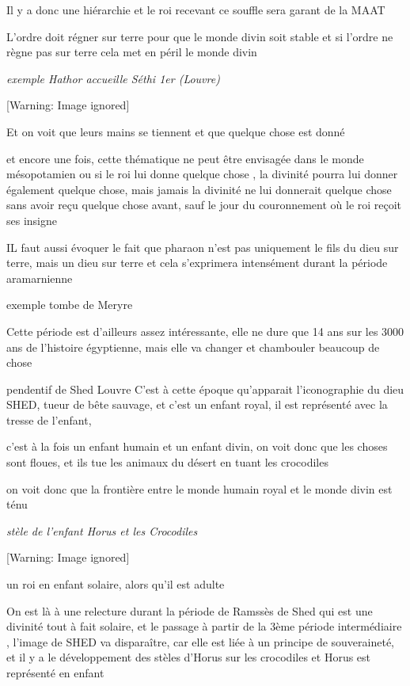 \documentclass[a4paper,10pt]{article}
\begin{document}
\begin{itemize}
Il y a donc une hiérarchie et le roi recevant ce souffle sera garant de
la MAAT

L'ordre doit régner sur terre pour que le monde divin
soit stable et si l'ordre ne règne pas sur terre cela
met en péril le monde divin

\textit{exemple Hathor accueille Séthi 1er (Louvre)}

  [Warning: Image ignored] %
 

Et on voit que leurs mains se tiennent et que quelque chose est donné

et encore une fois, cette thématique ne peut être envisagée dans le
monde mésopotamien ou si le roi lui donne quelque chose , la divinité
pourra lui donner également quelque chose,  mais jamais la divinité ne
lui donnerait quelque chose sans avoir reçu quelque chose avant, sauf
le jour du couronnement où le roi reçoit ses insigne

IL faut aussi évoquer le fait que pharaon n'est pas
uniquement le fils du dieu sur terre, mais un dieu sur terre  et cela
s'exprimera intensément durant la période aramarnienne


exemple tombe de Meryre

Cette période est d'ailleurs assez intéressante, elle
ne dure que 14 ans sur les 3000 ans de l'histoire
égyptienne, mais elle va changer et chambouler beaucoup de chose

pendentif de Shed Louvre  C'est à cette époque
qu'apparait l'iconographie du dieu
SHED, tueur de bête sauvage, et c'est un enfant royal,
il est représenté avec la tresse de l'enfant, 

c'est à la fois un enfant humain et un enfant divin, on
voit donc que les choses sont floues, et ils tue les animaux du désert
en tuant les crocodiles

on voit donc que la frontière entre le monde humain royal et le monde
divin est ténu

\textit{stèle de l'enfant Horus et les Crocodiles}

  [Warning: Image ignored] %
 

un roi en enfant solaire, alors qu'il est adulte

On est là à une relecture durant la période de Ramssès de Shed qui est
une divinité tout à fait solaire, et le passage à partir de la 3ème
période intermédiaire , l'image de SHED va
disparaître, car elle est liée à un principe de souveraineté,  et il y
a le développement des stèles d'Horus sur les
crocodiles et Horus est représenté en enfant


\end{itemize}
\end{document}

